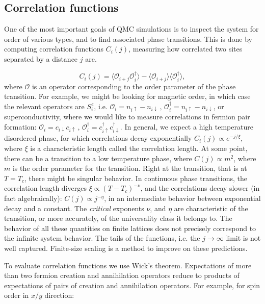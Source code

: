 \subsection{Correlation functions}

One of the most important goals of QMC simulations is to inspect the system for order of various types, and to find  associated phase transitions. This is done by computing correlation functions $C_i (j) $, measuring how correlated two sites separated by a distance $j$ are.

\begin{equation}
C_i (j) = \big\langle \mathcal{O}_{i+j} \mathcal{O}_{i}^\dagger \big\rangle - \langle \mathcal{O}_{i+j} \big\rangle\big\langle\mathcal{O}_{i}^\dagger \big\rangle ,
\end{equation}
where $\mathcal{O}$ is an operator corresponding to the order parameter of the phase transition. For example, we might be looking for magnetic order, in which case the relevant operators are $S^z_i$, i.e. $\mathcal{O}_i = n_{i\uparrow} - n_{i\downarrow} \, , \, \mathcal{O}_i^\dagger = n_{i\uparrow} - n_{i\downarrow}$, or superconductivity, where we would like to measure correlations in fermion pair formation: $\mathcal{O}_i = c_{i\downarrow} c_{i\uparrow} \, , \, \mathcal{O}_i^\dagger = c_{i\uparrow}^\dagger c_{i\downarrow}^\dagger$.
In general, we expect a high temperature disordered phase, for which correlations decay exponentially $C_i (j) \propto e^{-j/\xi}$, where $\xi$ is a characteristic length called the correlation length. At some point, there can be a transition to a low temperature phase, where $C(j) \propto m^2$, where $m$ is the order parameter for the transition. Right at the transition, that is at $T = T_c$, there might be singular behavior. In continuous phase transitions, the correlation length diverges $\xi \propto (T-T_c)^{-\nu}$, and the correlations decay slower (in fact algebraically): $C(j) \propto j^{-\eta}$, in an intermediate behavior between exponential decay and a constant. The \emph{critical} exponents $\nu$, and $\eta$ are characteristic of the transition, or more accurately, of the universality class it belongs to.
The behavior of all these quantities on finite lattices does not precisely correspond to the infinite system behavior. The tails of the functions, i.e. the $j\rightarrow \infty$ limit is not well captured. Finite-size scaling is a method to improve on these predictions.

To evaluate correlation functions we use Wick's theorem. Expectations of more than two fermion creation and annihilation operators reduce to products of expectations of pairs of creation and annihilation operators. For example, for spin order in $x/y$ direction:

